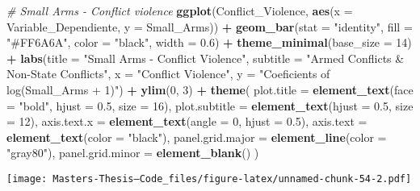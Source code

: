 \documentclass[
  11pt,
]{article}
\newenvironment{Shaded}{\begin{snugshade}}{\end{snugshade}}
\newcommand{\AttributeTok}[1]{\textcolor[rgb]{0.13,0.29,0.53}{#1}}
\newcommand{\CommentTok}[1]{\textcolor[rgb]{0.56,0.35,0.01}{\textit{#1}}}
\newcommand{\DecValTok}[1]{\textcolor[rgb]{0.00,0.00,0.81}{#1}}
\newcommand{\FloatTok}[1]{\textcolor[rgb]{0.00,0.00,0.81}{#1}}
\newcommand{\FunctionTok}[1]{\textcolor[rgb]{0.13,0.29,0.53}{\textbf{#1}}}
\newcommand{\NormalTok}[1]{#1}
\newcommand{\SpecialCharTok}[1]{\textcolor[rgb]{0.81,0.36,0.00}{\textbf{#1}}}
\newcommand{\StringTok}[1]{\textcolor[rgb]{0.31,0.60,0.02}{#1}}
\begin{document}
\begin{Shaded}
\begin{Highlighting}[]
\CommentTok{\# Small Arms {-} Conflict violence}
\FunctionTok{ggplot}\NormalTok{(Conflict\_Violence, }\FunctionTok{aes}\NormalTok{(}\AttributeTok{x =}\NormalTok{ Variable\_Dependiente, }\AttributeTok{y =}\NormalTok{ Small\_Arms)) }\SpecialCharTok{+}
  \FunctionTok{geom\_bar}\NormalTok{(}\AttributeTok{stat =} \StringTok{"identity"}\NormalTok{, }\AttributeTok{fill =} \StringTok{"\#FF6A6A"}\NormalTok{, }\AttributeTok{color =} \StringTok{"black"}\NormalTok{, }\AttributeTok{width =} \FloatTok{0.6}\NormalTok{) }\SpecialCharTok{+}
  \FunctionTok{theme\_minimal}\NormalTok{(}\AttributeTok{base\_size =} \DecValTok{14}\NormalTok{) }\SpecialCharTok{+}
  \FunctionTok{labs}\NormalTok{(}\AttributeTok{title =} \StringTok{"Small Arms {-} Conflict Violence"}\NormalTok{,}
       \AttributeTok{subtitle =} \StringTok{"Armed Conflicts \& Non{-}State Conflicts"}\NormalTok{,}
       \AttributeTok{x =} \StringTok{"Conflict Violence"}\NormalTok{,}
       \AttributeTok{y =} \StringTok{"Coeficients of log(Small\_Arms + 1)"}\NormalTok{) }\SpecialCharTok{+}
  \FunctionTok{ylim}\NormalTok{(}\DecValTok{0}\NormalTok{, }\DecValTok{3}\NormalTok{) }\SpecialCharTok{+}
  \FunctionTok{theme}\NormalTok{(}
    \AttributeTok{plot.title =} \FunctionTok{element\_text}\NormalTok{(}\AttributeTok{face =} \StringTok{"bold"}\NormalTok{, }\AttributeTok{hjust =} \FloatTok{0.5}\NormalTok{, }\AttributeTok{size =} \DecValTok{16}\NormalTok{),}
    \AttributeTok{plot.subtitle =} \FunctionTok{element\_text}\NormalTok{(}\AttributeTok{hjust =} \FloatTok{0.5}\NormalTok{, }\AttributeTok{size =} \DecValTok{12}\NormalTok{),}
    \AttributeTok{axis.text.x =} \FunctionTok{element\_text}\NormalTok{(}\AttributeTok{angle =} \DecValTok{0}\NormalTok{, }\AttributeTok{hjust =} \FloatTok{0.5}\NormalTok{),}
    \AttributeTok{axis.text =} \FunctionTok{element\_text}\NormalTok{(}\AttributeTok{color =} \StringTok{"black"}\NormalTok{),}
    \AttributeTok{panel.grid.major =} \FunctionTok{element\_line}\NormalTok{(}\AttributeTok{color =} \StringTok{"gray80"}\NormalTok{),}
    \AttributeTok{panel.grid.minor =} \FunctionTok{element\_blank}\NormalTok{()}
\NormalTok{  )}
\end{Highlighting}
\end{Shaded}

\texttt{[image: Masters-Thesis--Code\_files/figure-latex/unnamed-chunk-54-2.pdf]}
\end{document}
